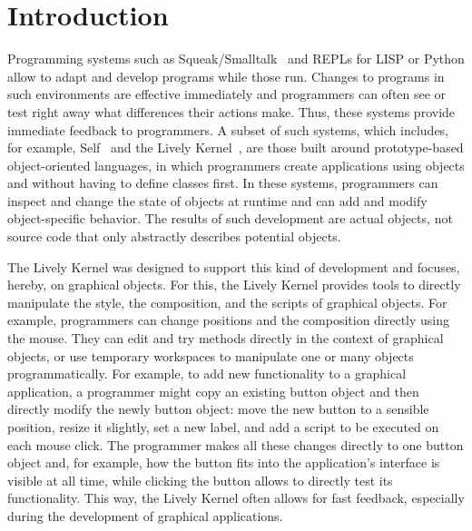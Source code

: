 
\chapter{Introduction} \label{chapter:INTRODUCTION}

Programming systems such as Squeak/Smalltalk~\cite{Ingalls1997Squeak,GoldbergRobson83} and REPLs for LISP or Python allow to adapt and develop programs while those run.
Changes to programs in such environments are effective immediately and programmers can often see or test right away what differences their actions make.
Thus, these systems provide immediate feedback to programmers.
A subset of such systems, which includes, for example, Self~\cite{Ungar1987SPS,Ungar2007SEL} and the Lively Kernel~\cite{Ingalls2008LKS,Krahn2009LWD}, are those built around prototype-based object-oriented languages, in which programmers create applications using objects and without having to define classes first.
In these systems, programmers can inspect and change the state of objects at runtime and can add and modify object-specific behavior.
The results of such development are actual objects, not source code that only abstractly describes potential objects.

The Lively Kernel was designed to support this kind of development and focuses, hereby, on graphical objects.
For this, the Lively Kernel provides tools to directly manipulate the style, the composition, and the scripts of graphical objects.
For example, programmers can change positions and the composition directly using the mouse.
They can edit and try methods directly in the context of graphical objects, or use temporary workspaces to manipulate one or many objects programmatically.
For example, to add new functionality to a graphical application, a programmer might copy an existing button object and then directly modify the newly button object: move the new button to a sensible position, resize it slightly, set a new label, and add a script to be executed on each mouse click.
The programmer makes all these changes directly to one button object and, for example, how the button fits into the application's interface is visible at all time, while clicking the button allows to directly test its functionality.
This way, the Lively Kernel often allows for fast feedback, especially during the development of graphical applications.

